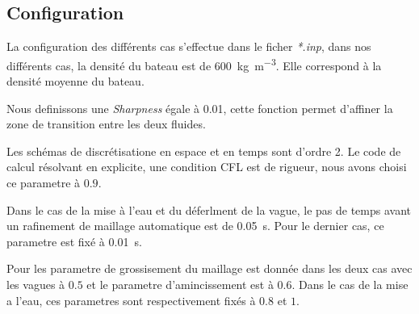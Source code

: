 \documentclass[../main.tex]{subfiles}
\begin{document}
\subsection{Configuration}

La configuration des différents cas s'effectue dans le ficher \textit{*.inp}, dans nos différents cas, la densité du bateau est de \qty{600}{\kilogram\per\cubic\m}. Elle correspond à la densité moyenne du bateau.

Nous definissons une \textit{Sharpness} égale à 0.01, cette fonction permet d'affiner la zone de transition entre les deux fluides.


Les schémas de discrétisatione en espace et en temps sont d'ordre 2. Le code de calcul résolvant en explicite, une condition CFL est de rigueur, nous avons choisi ce parametre à $0.9$.


Dans le cas de la mise à l'eau et du déferlment de la vague, le pas de temps avant un rafinement de maillage automatique est de \qty{0.05}{s}. Pour le dernier cas, ce parametre est fixé à \qty{0.01}{s}.

Pour les parametre de grossisement du maillage est donnée dans les deux cas avec les vagues à $0.5$ et le parametre d'amincissement est à $0.6$.
Dans le cas de la mise a l'eau, ces parametres sont respectivement fixés à $0.8$ et $1$.
\end{document}
